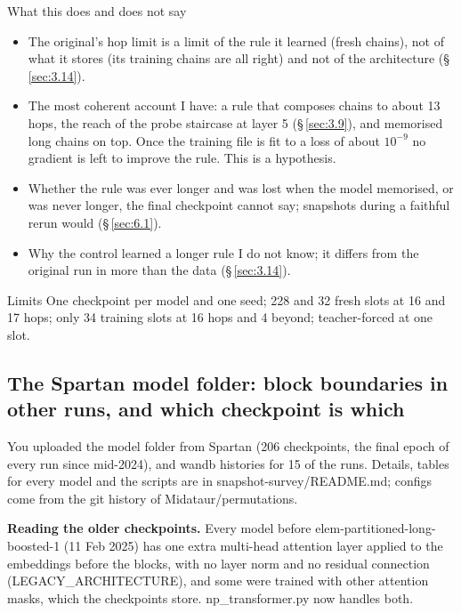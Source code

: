 \documentclass[paper=a4,fontsize=11pt,DIV=11,parskip=half,headings=small,numbers=noendperiod]{scrartcl}
\DeclareRobustCommand{\lead}[1]{\textsf{\bfseries\color{accent}#1}}
\DeclareRobustCommand{\code}[1]{{\fontseries{m}\ttfamily #1}}
\begin{document}
\begin{findbox}{What this does and does not say}
\begin{itemize}
\item The original’s hop limit is a limit of the rule it learned (fresh chains), not of what it stores (its
  training chains are all right) and not of the architecture (\S\,\ref{sec:3.14}).
\item The most coherent account I have: a rule that composes chains to about 13 hops, the reach of the probe
  staircase at layer 5 (\S\,\ref{sec:3.9}), and memorised long chains on top. Once the training file is fit to a
  loss of about $10^{-9}$ no gradient is left to improve the rule. This is a hypothesis.
\item Whether the rule was ever longer and was lost when the model memorised, or was never longer, the final
  checkpoint cannot say; snapshots during a faithful rerun would (\S\,\ref{sec:6.1}).
\item Why the control learned a longer rule I do not know; it differs from the original run in more than the
  data (\S\,\ref{sec:3.14}).
\end{itemize}
\end{findbox}

\begin{limbox}{Limits}
One checkpoint per model and one seed; 228 and 32 fresh slots at 16 and 17 hops; only 34 training slots at 16
hops and 4 beyond; teacher-forced at one slot.
\end{limbox}

\subsection{The Spartan model folder: block boundaries in other runs, and which checkpoint is
which}\label{sec:3.18}
You uploaded the model folder from Spartan (206 checkpoints, the final epoch of every run since mid-2024), and
wandb histories for 15 of the runs. Details, tables for every model and the scripts are in
\code{snapshot-\allowbreak{}survey/\allowbreak{}README.\allowbreak{}md}; configs come from the git history of
\code{Midataur/\allowbreak{}permutations}.

\lead{Reading the older checkpoints.} Every model before
\code{elem-\allowbreak{}partitioned-\allowbreak{}long-\allowbreak{}boosted-\allowbreak{}1} (11 Feb 2025) has one
extra multi-head attention layer applied to the embeddings before the blocks, with no layer norm and no residual
connection (\code{LEGACY\_\allowbreak{}ARCHITECTURE}), and some were trained with other attention masks, which
the checkpoints store. \code{np\_\allowbreak{}transformer.\allowbreak{}py} now handles both.
\end{document}
